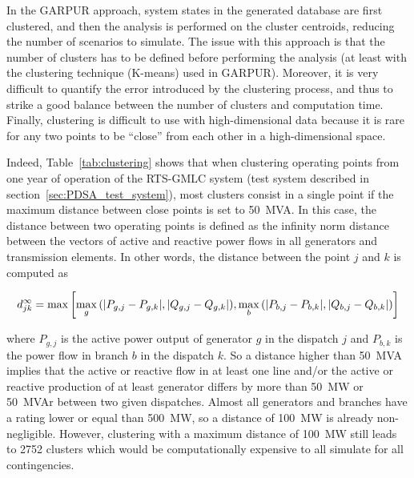 In the GARPUR approach, system states in the generated database are first clustered, and then the analysis is performed on the cluster centroids, reducing the number of scenarios to simulate. The issue with this approach is that the number of clusters has to be defined before performing the analysis (at least with the clustering technique (K-means) used in GARPUR). Moreover, it is very difficult to quantify the error introduced by the clustering process, and thus to strike a good balance between the number of clusters and computation time. Finally, clustering is difficult to use with high-dimensional data because it is rare for any two points to be ``close'' from each other in a high-dimensional space.

Indeed, Table~\ref{tab:clustering} shows that when clustering operating points from one year of operation of the RTS-GMLC system (test system described in section~\ref{sec:PDSA_test_system}), most clusters consist in a single point if the maximum distance between close points is set to 50~MVA. In this case, the distance between two operating points is defined as the infinity norm distance between the vectors of active and reactive power flows in all generators and transmission elements. In other words, the distance between the point \(j\) and \(k\) is computed as

\begin{equation}
d^{\infty}_{jk} = \max{\left[\max_g{\left(\lvert P_{g, j} - P_{g, k}\rvert, \lvert Q_{g, j} - Q_{g, k}\rvert\right)}, \max_b{\left(\lvert P_{b, j} - P_{b, k}\rvert, \lvert Q_{b, j} - Q_{b, k}\rvert\right)}\right]}
\end{equation}

\noindent where \(P_{g, j}\) is the active power output of generator \(g\) in the dispatch \(j\) and \(P_{b, k}\) is the power flow in branch \(b\) in the dispatch \(k\). So a distance higher than 50~MVA implies that the active or reactive flow in at least one line and/or the active or reactive production of at least generator differs by more than 50~MW or 50~MVAr between two given dispatches. Almost all generators and branches have a rating lower or equal than 500~MW, so a distance of 100~MW is already non-negligible. However, clustering with a maximum distance of 100~MW still leads to 2752 clusters which would be computationally expensive to all simulate for all contingencies.

